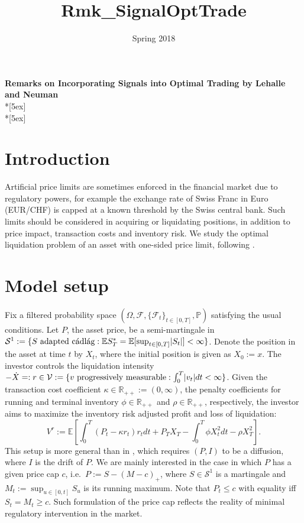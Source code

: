 \documentclass[openany,oneside]{article}
\title{Rmk_SignalOptTrade}
\date{Spring 2018}
\theoremstyle{definition}
\theoremstyle{remark}
\newcommand{\E}{\mathbb{E}} %
\renewcommand{\P}{\mathbb{P}} %
\newcommand{\F}{\mathcal{F}} %
\DeclarePairedDelimiter{\abs}{\lvert}{\rvert} %
\newcommand{\ts}{\textstyle}
\begin{document}
\begin{center}	
	\textbf{\Large Remarks on Incorporating Signals into Optimal Trading by Lehalle and Neuman} \\*[5ex]
    \thedate \\*[5ex]
\end{center}


\section{Introduction}
Artificial price limits are sometimes enforced in the financial market due to regulatory powers, for example the exchange rate of Swiss Franc in Euro (EUR/CHF) is capped at a known threshold by the Swiss central bank. Such limits should be considered in acquiring or liquidating positions, in addition to price impact, transaction costs and inventory risk. We study the optimal liquidation problem of an asset with one-sided price limit, following \cite{lehalle2017incorporating}.


\section{Model setup}
Fix a filtered probability space $(\Omega, \F, \{\F_t\}_{t\in[0,T]}, \P)$ satisfying the usual conditions. Let $P$, the asset price, be a semi-martingale in $\mathcal{S}^1:=\{S \textrm{ adapted c\'adl\'ag} : \E S^\ast_T = \E[\sup_{t\in[0,T]} \abs{S_t}] < \infty\}$. Denote the position in the asset at time $t$ by $X_t$, where the initial position is given as $X_0:=x$. The investor controls the liquidation intensity $-\dot{X} =: r \in \mathcal{V} := \{v \textrm{ progressively measurable} : \int_0^T \abs{v_t} dt < \infty \}$. Given the transaction cost coefficient $\kappa\in\mathbb{R}_{++}:=(0,\infty)$, the penalty coefficients for running and terminal inventory $\phi\in\mathbb{R}_{++}$ and $\rho\in\mathbb{R}_{++}$, respectively, the investor aims to maximize the inventory risk adjusted profit and loss of liquidation:
\[
\ts V^r:= \E\left[\int_0^T (P_t - \kappa r_t)r_t dt + P_T X_T - \int_0^T \phi X_t^2 dt - \rho X_T^2 \right].
\]
This setup is more general than in \cite{lehalle2017incorporating}, which requires $(P,I)$ to be a diffusion, where $I$ is the drift of $P$. We are mainly interested in the case in which $P$ has a given price cap $c$, i.e.\ $P:=S-(M-c)_+$, where $S\in\mathcal{S}^1$ is a martingale and $M_t:=\sup_{u\in[0,t]} S_u$ is its running maximum. Note that $P_t\le c$ with equality iff $S_t=M_t\ge c$. Such formulation of the price cap reflects the reality of minimal regulatory intervention in the market.
\end{document}
